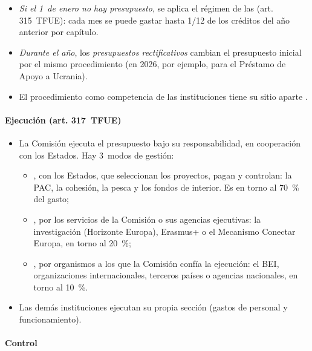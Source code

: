 \documentclass[11pt]{article}
\begin{document}
\begin{itemize}
\begin{itemize}
  \item \emph{Paso 5}: el presidente del Parlamento declara adoptado el presupuesto, normalmente a finales de noviembre o en diciembre.
  \end{itemize}
\item \emph{Si el 1~de enero no hay presupuesto}, se aplica el régimen de las  (art. 315~TFUE): cada mes se puede gastar hasta 1/12 de los créditos del año anterior por capítulo.
\item \emph{Durante el año}, los \emph{presupuestos rectificativos} cambian el presupuesto inicial por el mismo procedimiento (en 2026, por ejemplo, para el Préstamo de Apoyo a Ucrania).
\item El procedimiento como competencia de las instituciones tiene su sitio aparte .
\end{itemize}

\paragraph{Ejecución (art. 317~TFUE)}

\begin{itemize}
\item La Comisión ejecuta el presupuesto bajo su responsabilidad, en cooperación con los Estados. Hay 3~modos de gestión\nocite{CE2026ModosGestion}:
  \begin{itemize}
  \item {}, con los Estados, que seleccionan los proyectos, pagan y controlan: la PAC, la cohesión, la pesca y los fondos de interior. Es en torno al 70~\% del gasto;
  \item {}, por los servicios de la Comisión o sus agencias ejecutivas: la investigación (Horizonte Europa), Erasmus+ o el Mecanismo Conectar Europa, en torno al 20~\%;
  \item {}, por organismos a los que la Comisión confía la ejecución: el BEI, organizaciones internacionales, terceros países o agencias nacionales, en torno al 10~\%.
  \end{itemize}
\item Las demás instituciones ejecutan su propia sección (gastos de personal y funcionamiento).
\end{itemize}

\paragraph{Control}\label{sec:control}
\end{document}
